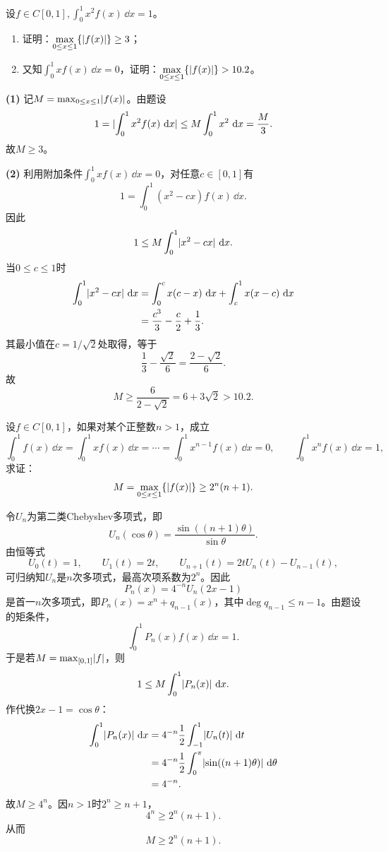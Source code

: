 \begin{xreferenceproblem}[3]
设$f\in C[0,1],\int_0^1x^2f(x)\,\dd x=1$。
  \begin{enumerate}[label=(\arabic*)]
    \item 证明：$\displaystyle\max_{0\le x\le1}\{\lvert f(x)\rvert\}\ge3$；
    \item 又知$\int_0^1xf(x)\,\dd x=0$，证明：$\displaystyle\max_{0\le x\le1}\{\lvert f(x)\rvert\}>10.2$。
  \end{enumerate}
\end{xreferenceproblem}
\begin{xsolution}
\textbf{(1)}\quad
记$M=\max_{0\le x\le1}\lvert f(x)\rvert$。由题设
\[
 1=\lvert\int_0^1x^2f(x)\,\mathop{}\!\mathrm{d} x\rvert
 \le M\int_0^1x^2\,\mathop{}\!\mathrm{d} x=\frac M3.
\]
故$M\ge3$。

\textbf{(2)}\quad
利用附加条件$\int_0^1xf(x)\,\dd x=0$，对任意$c\in[0,1]$有
\[
 1=\int_0^1(x^2-cx)f(x)\,\dd x.
\]
因此
\[
 1\le M\int_0^1\lvert x^2-cx\rvert\,\mathop{}\!\mathrm{d} x.
\]
当$0\le c\le1$时
\begin{align*}
\int_0^1\lvert x^2-cx\rvert\,\mathop{}\!\mathrm{d} x
&=\int_0^cx(c-x)\,\mathop{}\!\mathrm{d} x+\int_c^1x(x-c)\,\mathop{}\!\mathrm{d} x\\
&=\frac{c^3}{3}-\frac c2+\frac13.
\end{align*}
其最小值在$c=1/\sqrt2$处取得，等于
\[
 \frac13-\frac{\sqrt2}{6}=\frac{2-\sqrt2}{6}.
\]
故
\[
 M\ge\frac6{2-\sqrt2}=6+3\sqrt2>10.2.
\]
\end{xsolution}


\begin{xreferenceproblem}[4]
设$f\in C[0,1]$，如果对某个正整数$n>1$，成立
  \[
    \int_0^1f(x)\,\dd x=\int_0^1xf(x)\,\dd x=\cdots
    =\int_0^1x^{n-1}f(x)\,\dd x=0,
    \qquad
    \int_0^1x^nf(x)\,\dd x=1,
  \]
  求证：
  \[
    M=\max_{0\le x\le1}\{\lvert f(x)\rvert\}\ge2^n(n+1).
  \]
\end{xreferenceproblem}
\begin{xsolution}
令$U_n$为第二类Chebyshev多项式，即
\[
 U_n(\cos\theta)=\frac{\sin((n+1)\theta)}{\sin\theta}.
\]
由恒等式
\[
 U_0(t)=1,\qquad U_1(t)=2t,\qquad
 U_{n+1}(t)=2tU_n(t)-U_{n-1}(t),
\]
可归纳知$U_n$是$n$次多项式，最高次项系数为$2^n$。因此
\[
 P_n(x)=4^{-n}U_n(2x-1)
\]
是首一$n$次多项式，即$P_n(x)=x^n+q_{n-1}(x)$，其中$\deg q_{n-1}\le n-1$。由题设的矩条件，
\[
 \int_0^1P_n(x)f(x)\,\dd x=1.
\]
于是若$M=\max_{[0,1]}\lvert f\rvert$，则
\[
 1\le M\int_0^1\lvert P_n(x)\rvert\,\mathop{}\!\mathrm{d} x.
\]
作代换$2x-1=\cos\theta$：
\begin{align*}
\int_0^1\lvert P_n(x)\rvert\,\mathop{}\!\mathrm{d} x
&=4^{-n}\frac12\int_{-1}^1\lvert U_n(t)\rvert\,\mathop{}\!\mathrm{d} t\\
&=4^{-n}\frac12\int_0^\pi\lvert\sin((n+1)\theta)\rvert\,\mathop{}\!\mathrm{d}\theta\\
&=4^{-n}.
\end{align*}
故$M\ge4^n$。因$n>1$时$2^n\ge n+1$，
\[
 4^n\ge2^n(n+1).
\]
从而
\[
 \boxed{M\ge2^n(n+1)}.
\]
\end{xsolution}


